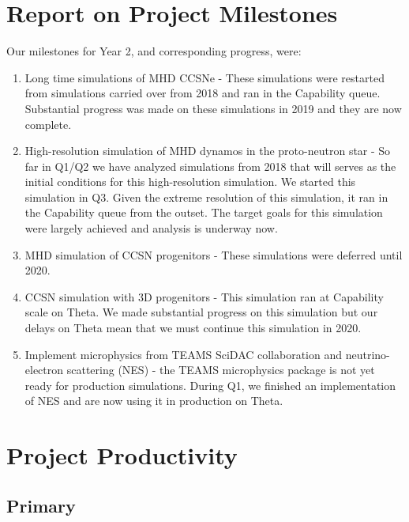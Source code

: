 \documentclass[12pt,titlepage]{article}
\begin{document}
\section{Report on Project Milestones}

Our milestones for Year 2, and corresponding progress, were:
\begin{enumerate}
    \item Long time simulations of MHD CCSNe - These simulations were restarted from simulations carried over from 2018 and ran in the Capability queue. Substantial progress was made on these simulations in 2019 and they are now complete.
    \item High-resolution simulation of MHD dynamos in the proto-neutron star - So far in Q1/Q2 we have analyzed simulations from 2018 that will serves as the initial conditions for this high-resolution simulation. We started this simulation in Q3. Given the extreme resolution of this simulation, it ran in the Capability queue from the outset. The target goals for this simulation were largely achieved and analysis is underway now.
    \item MHD simulation of CCSN progenitors - These simulations were deferred until 2020.
    \item CCSN simulation with 3D progenitors - This simulation ran at Capability scale on Theta. We made substantial progress on this simulation but our delays on Theta mean that we must continue this simulation in 2020.
    \item Implement microphysics from TEAMS SciDAC collaboration and neutrino-electron scattering (NES) - the TEAMS microphysics package is not yet ready for production simulations. During Q1, we finished an implementation of NES and are now using it in production on Theta.
\end{enumerate}



\section{Project Productivity}

\subsection{Primary}
\end{document}
